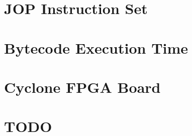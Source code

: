 \chapter{JOP Instruction Set} \label{appx:jop:instr}


\chapter{Bytecode Execution Time} \label{appx:bytecode}


%

%


\chapter{Cyclone FPGA Board} \label{appx:cycore}


%




\printindex

\chapter{TODO}




